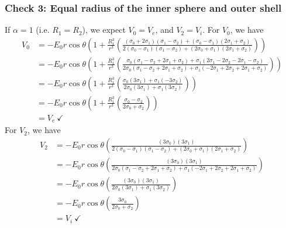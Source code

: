 \subsubsection{Check 3: Equal radius of the inner sphere and outer shell}
If $\alpha = 1$ (i.e. $R_1 = R_2$), we expect $V_0 = V_e$, and $V_2 = V_i$. For $V_0$, we have
\begin{displaymath}
    \begin{split}
    V_0
    &= -E_0 r \cos\theta
    \left(1+
    \frac{R_1^{3}}{r^3}
    \left(
    \frac{
    (\sigma_0 + 2\sigma_1)(\sigma_1 - \sigma_2) + (\sigma_0 - \sigma_1)(2\sigma_1 + \sigma_2)
    }
    {
    2 (\sigma_0-\sigma_1)(\sigma_1 - \sigma_2) + (2\sigma_0 + \sigma_1)(2\sigma_1 + \sigma_2)
    }
    \right)\right)
    \\
    &= -E_0 r \cos\theta
    \left(1+
    \frac{R_1^{3}}{r^3}
    \left(
    \frac{
    \sigma_0 (\sigma_1 - \sigma_2 + 2\sigma_1 + \sigma_2)
    + \sigma_1(2\sigma_1 - 2\sigma_2- 2\sigma_1 - \sigma_2)
    }
    {
    2 \sigma_0(\sigma_1 - \sigma_2 + 2\sigma_1 + \sigma_2)
    + \sigma_1(-2\sigma_1 + 2\sigma_2 +2\sigma_1 + \sigma_2)
    }
    \right)\right)
    \\
    &= -E_0 r \cos\theta
    \left(1+
    \frac{R_1^{3}}{r^3}
    \left(
    \frac{
    \sigma_0 (3\sigma_1)
    + \sigma_1( - 3\sigma_2)
    }
    {
    2 \sigma_0(3\sigma_1)
    + \sigma_1(3\sigma_2)
    }
    \right)\right)
    \\
    &= -E_0 r \cos\theta
    \left(1+
    \frac{R_1^{3}}{r^3}
    \left(
    \frac{
    \sigma_0
    - \sigma_2
    }
    {
    2 \sigma_0
    + \sigma_2
    }
    \right)\right)
    \\
    &=
    V_e ~\checkmark
    \end{split}
\end{displaymath}
For $V_2$, we have
\begin{displaymath}
    \begin{split}
        V_2
        &=-E_0 r\cos\theta
         \left(
        \frac{
        (3 \sigma_0) (3\sigma_1)
        }
        {
        2 (\sigma_0-\sigma_1)(\sigma_1 - \sigma_2) + (2\sigma_0 + \sigma_1)(2\sigma_1 + \sigma_2)
        }
        \right)
        \\
        &=-E_0 r\cos\theta
         \left(
        \frac{
        (3 \sigma_0) (3\sigma_1)
        }
        {
        2\sigma_0(\sigma_1 - \sigma_2 +2\sigma_1 + \sigma_2)
        +\sigma_1(-2\sigma_1 + 2\sigma_2 + 2\sigma_1 + \sigma_2)
        }
        \right)
        \\
        &=-E_0 r\cos\theta
         \left(
        \frac{
        (3 \sigma_0) (3\sigma_1)
        }
        {
        2\sigma_0(3\sigma_1)
        +\sigma_1(3\sigma_2 )
        }
        \right)
        \\
        &=-E_0 r\cos\theta
         \left(
        \frac{
         3\sigma_0
        }
        {
        2\sigma_0
        +\sigma_2
        }
        \right)
        \\
        &=V_i ~\checkmark
    \end{split}
\end{displaymath}

